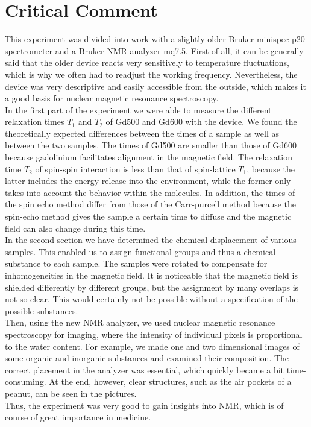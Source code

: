 \section{Critical Comment}
This experiment was divided into work with a slightly older Bruker minispec p20 spectrometer and a Bruker NMR analyzer mq7.5.
First of all, it can be generally said that the older device reacts very sensitively to temperature fluctuations, which is why we often had to readjust the working frequency.
Nevertheless, the device was very descriptive and easily accessible from the outside, which makes it a good basis for nuclear magnetic resonance spectroscopy.\\
In the first part of the experiment we were able to measure the different relaxation times $T_1$ and $T_2$ of Gd500 and Gd600 with the device.
We found the theoretically expected differences between the times of a sample as well as between the two samples.
The times of Gd500 are smaller than those of Gd600 because gadolinium facilitates alignment in the magnetic field.
The relaxation time $T_2$ of spin-spin interaction is less than that of spin-lattice $T_1$, because the latter includes the energy release into the environment, while the former only takes into account the behavior within the molecules. 
In addition, the times of the spin echo method differ from those of the Carr-purcell method because the spin-echo method gives the sample a certain time to diffuse and the magnetic field can also change during this time.\\
In the second section we have determined the chemical displacement of various samples.
This enabled us to assign functional groups and thus a chemical substance to each sample.
The samples were rotated to compensate for inhomogeneities in the magnetic field.
It is noticeable that the magnetic field is shielded differently by different groups, but the assignment by many overlaps is not so clear.
This would certainly not be possible without a specification of the possible substances.\\
Then, using the new NMR analyzer, we used nuclear magnetic resonance spectroscopy for imaging, where the intensity of individual pixels is proportional to the water content.
For example, we made one and two dimensional images of some organic and inorganic substances and examined their composition.
The correct placement in the analyzer was essential, which quickly became a bit time-consuming.
At the end, however, clear structures, such as the air pockets of a peanut, can be seen in the pictures.\\
Thus, the experiment was very good to gain insights into NMR, which is of course of great importance in medicine. 